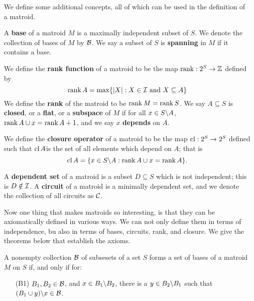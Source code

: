 We define some additional concepts, all of which can be used in the definition of a matroid.

\begin{definition}
    A \textbf{base} of a matroid $M$ is a maximally independent subset of  $S$. We denote the
    collection of bases of $M$ by  $\mathcal{B}$. We say a subset of  $S$ is \textbf {spanning} in $M$ if it
    contains a base.
\end{definition}

\begin{definition}
    We define the \textbf{rank function} of a matroid to be the map $\operatorname{rank}:2^S \rightarrow \mathbb{Z}$
    defined by
        \begin{equation}
        \operatorname{rank}{A}=\max\{|X|:X \in \mathcal{I} \text{ and } X \subseteq A\}
        \end{equation} 
    We define the \textbf{rank} of the matroid to be $\operatorname{rank}{M}=\operatorname{rank}{S}$. We say $A \subseteq S$ is
    \textbf{closed}, or a \textbf{flat}, or a \textbf{subspace} of $M$ if for all  $x \in
    S\backslash A$, $\operatorname{rank}{A \cup x}=\operatorname{rank}{A}+1$, and we say $x$ \textbf{depends} on $A$.
\end{definition}

\begin{definition}
    We define the \textbf{closure operator} of a matroid to be the map $\operatorname{cl}:2^S \rightarrow 2^S$
    defined such that  $\operatorname{cl}{A}$is the set of all elements which depend on $A$; that is
        \begin{equation}
            \operatorname{cl}{A}=\{x \in S\backslash A:\operatorname{rank}{A \cup x}=\operatorname{rank}{A}\}.
        \end{equation}
\end{definition}

\begin{definition}
    A \textbf{dependent set} of a matroid is a subset $D \subseteq S$ which is not independent; this
    is $D \notin \mathcal{I}$. A \textbf {circuit} of a matroid is a minimally dependent set, and we denote
    the collection of all circuits as $\mathcal{C}$.
\end{definition}

Now one thing that makes matroids so interesting, is that they can be axiomatically defined in
various ways. We can not only define them in terms of independence, bu also in terms of bases,
circuits, rank, and closure. We give the theorems below that establish the axioms.

\begin{theorem}\label{1.1.1}
    A nonempty collection $\mathcal{B}$ of subsesets of a set $S$ forms a set of bases of a matroid $M$ on
    $S$ if, and only if for:
        \begin{enumerate}
            \item[(B1)] $ B_1,B_2 \in \mathcal{B}$, and $x \in B_1\backslash B_2$, there is a $y \in
                B_2\backslash B_1$ such that $(B_1 \cup y)\backslash x \in \mathcal{B}$.
        \end{enumerate}
\end{theorem}

